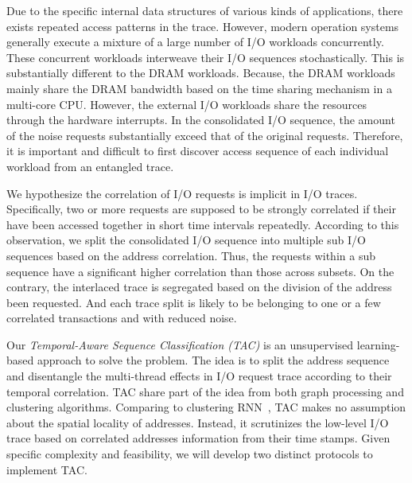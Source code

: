
Due to the specific internal data structures of various kinds of applications,
there exists repeated access patterns in the trace.
However, modern operation systems generally execute a mixture of a large number of I/O workloads concurrently.
These concurrent workloads interweave their I/O sequences stochastically.
This is substantially different to the DRAM workloads.
Because, the DRAM workloads mainly share the DRAM bandwidth based on the time sharing mechanism in a multi-core CPU.
However, the external I/O workloads share the resources through the hardware interrupts.
In the consolidated I/O sequence, the amount of the noise requests substantially exceed that of the original requests.
Therefore, it is important and difficult to first discover access sequence of each individual workload from an entangled trace.

We hypothesize the correlation of I/O requests is implicit in I/O traces.
Specifically, two or more requests are supposed to be strongly correlated if their have been accessed together in short time intervals repeatedly.
According to this observation, we split the consolidated I/O sequence into multiple sub I/O sequences based on the address correlation.
Thus, the requests within a sub sequence have a significant higher correlation than those across subsets.
On the contrary, the interlaced trace is segregated based on the division of the address been requested.
And each trace split is likely to be belonging to one or a few correlated transactions and with reduced noise.

Our \emph{Temporal-Aware Sequence Classification (TAC)}
is an unsupervised learning-based approach to solve the problem.
The idea is to split the address sequence
and disentangle the multi-thread effects in I/O request trace
according to their temporal correlation.
TAC share part of the idea from both graph processing and clustering algorithms.
Comparing to clustering RNN~\cite{hashemi2018learning},
TAC makes no assumption about the spatial locality of addresses.
Instead, it scrutinizes the low-level I/O trace based on correlated addresses
information from their time stamps.
Given specific complexity and feasibility,
we will develop two distinct protocols to implement TAC.

